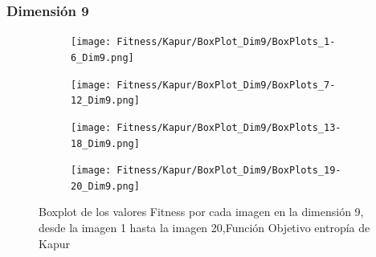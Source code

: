 \documentclass[conference]{IEEEtran}
\begin{document}
\subsubsection{Dimensión 9}

\begin{figure}
	\centering
	\begin{subfigure}{0.415\textwidth}
		\texttt{[image: Fitness/Kapur/BoxPlot\_Dim9/BoxPlots\_1-6\_Dim9.png]}
	\end{subfigure}
	
	\begin{subfigure}{0.415\textwidth}
		\texttt{[image: Fitness/Kapur/BoxPlot\_Dim9/BoxPlots\_7-12\_Dim9.png]}
	\end{subfigure}
	\begin{subfigure}{0.415\textwidth}
		\texttt{[image: Fitness/Kapur/BoxPlot\_Dim9/BoxPlots\_13-18\_Dim9.png]}
	\end{subfigure}
	\begin{subfigure}{0.415\textwidth}
		\texttt{[image: Fitness/Kapur/BoxPlot\_Dim9/BoxPlots\_19-20\_Dim9.png]}
		\vspace{4pt}
	\end{subfigure}
	\caption{Boxplot de los valores Fitness por cada imagen en la dimensión 9, desde la imagen 1 hasta la imagen 20,Función Objetivo entropía de Kapur}
	\label{fig:Boxplot_Fitnes_Dim9_Kapur}    
\end{figure}
 
\end{document}
